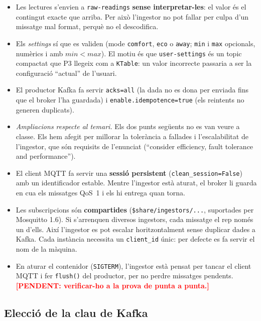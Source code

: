 \documentclass[11pt,a4paper]{article}
\newcommand{\pendent}[1]{\textcolor{red}{\textbf{[PENDENT: #1]}}}
\begin{document}
\begin{itemize}
  \item Les lectures s'envien a \texttt{raw-readings} \textbf{sense
        interpretar-les}: el valor és el contingut exacte que arriba. Per
        això l'ingestor no pot fallar per culpa d'un missatge mal format,
        perquè no el descodifica.
  \item Els \emph{settings} sí que es validen (mode \texttt{comfort},
        \texttt{eco} o \texttt{away}; \texttt{min} i \texttt{max} opcionals,
        numèrics i amb $\mathit{min} < \mathit{max}$). El motiu és que
        \texttt{user-settings} és un topic compactat que P3 llegeix com a
        \texttt{KTable}: un valor incorrecte passaria a ser la configuració
        ``actual'' de l'usuari.
  \item El productor Kafka fa servir \texttt{acks=all} (la dada no es dona
        per enviada fins que el broker l'ha guardada) i
        \texttt{enable.idempotence=true} (els reintents no generen
        duplicats).
  \item \emph{Ampliacions respecte al temari.} Els dos punts següents no es
        van veure a classe. Els hem afegit per millorar la tolerància a
        fallades i l'escalabilitat de l'ingestor, que són requisits de
        l'enunciat (``consider efficiency, fault tolerance and performance'').
  \item El client MQTT fa servir una \textbf{sessió persistent}
        (\texttt{clean\_session=False}) amb un identificador estable. Mentre
        l'ingestor està aturat, el broker li guarda en cua els missatges
        QoS~1 i els hi entrega quan torna.
  \item Les subscripcions són \textbf{compartides}
        (\texttt{\$share/ingestors/...}, suportades per Mosquitto 1.6). Si
        s'arrenquen diversos ingestors, cada missatge el rep només un d'ells.
        Així l'ingestor es pot escalar horitzontalment sense duplicar dades a
        Kafka. Cada instància necessita un \texttt{client\_id} únic: per
        defecte es fa servir el nom de la màquina.
  \item En aturar el contenidor (\texttt{SIGTERM}), l'ingestor està pensat per
        tancar el client MQTT i fer \texttt{flush()} del productor, per no
        perdre missatges pendents. \pendent{verificar-ho a la prova de punta a
        punta.}
\end{itemize}

\subsection{Elecció de la clau de Kafka}
\end{document}

